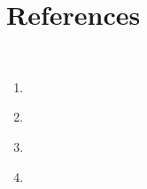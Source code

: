 \documentclass[11pt]{article}
\begin{document}
\section{References}
\

\begin{enumerate}
    \item \cite{ambjorn2012nonperturbative}
    \item \cite{ashtekar2006quantum}
    \item \cite{baum2020thermal}
    \item \cite{penrose2010cycles}
\end{enumerate}











\printglossaries
\printglossary

\printindex
\end{document}
